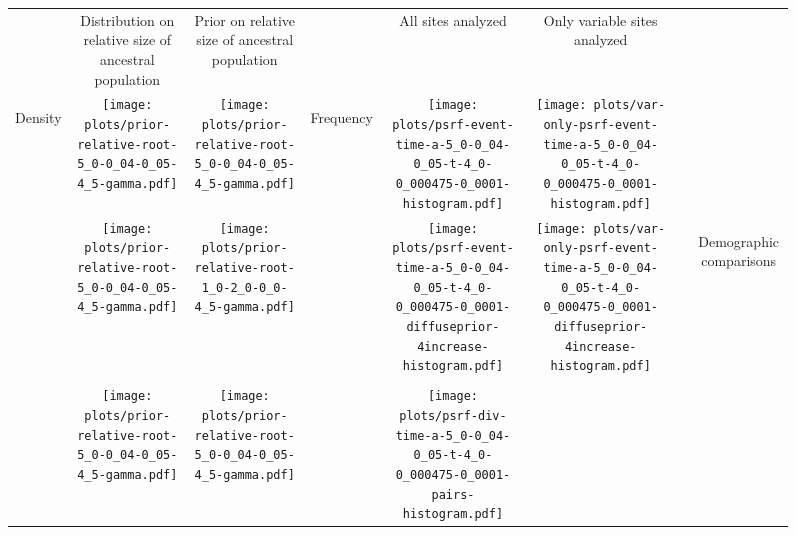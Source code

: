 \documentclass[border=10pt,varwidth=30cm]{standalone}
\begin{document}
\begin{figure}
    \setlength\arrayrulewidth{2pt}
    \centering
    \begin{tabular}{@{}cccccccc@{}}
        & \multirow{1}{0.15\textwidth}{\centering\Large Distribution on relative size of ancestral population}
        & \multirow{1}{0.15\textwidth}{\centering\Large Prior on relative size of ancestral population}
        &
        & \multirow{1}{0.15\textwidth}{\centering\Large All sites analyzed}
        & \multirow{1}{0.15\textwidth}{\centering\Large Only variable sites analyzed}
        & 
        & \\[9ex]
        \multirow{5}{*}[-8em]{\begin{sideways}\large Density\end{sideways}}
        & \texttt{[image: plots/prior-relative-root-5\_0-0\_04-0\_05-4\_5-gamma.pdf]}
        & \texttt{[image: plots/prior-relative-root-5\_0-0\_04-0\_05-4\_5-gamma.pdf]}
        & \multirow{5}{*}[-14em]{\begin{sideways}\large Frequency\end{sideways}}
        & \texttt{[image: plots/psrf-event-time-a-5\_0-0\_04-0\_05-t-4\_0-0\_000475-0\_0001-histogram.pdf]}
        & \texttt{[image: plots/var-only-psrf-event-time-a-5\_0-0\_04-0\_05-t-4\_0-0\_000475-0\_0001-histogram.pdf]} 
        & \multicolumn{1}{c|}{} 
        & \\
        & \texttt{[image: plots/prior-relative-root-5\_0-0\_04-0\_05-4\_5-gamma.pdf]}
        & \texttt{[image: plots/prior-relative-root-1\_0-2\_0-0\_0-4\_5-gamma.pdf]}
        &
        & \texttt{[image: plots/psrf-event-time-a-5\_0-0\_04-0\_05-t-4\_0-0\_000475-0\_0001-diffuseprior-4increase-histogram.pdf]}
        & \texttt{[image: plots/var-only-psrf-event-time-a-5\_0-0\_04-0\_05-t-4\_0-0\_000475-0\_0001-diffuseprior-4increase-histogram.pdf]}
        & \multicolumn{1}{c|}{} 
        & \multirow{5}{*}[17em]{\begin{sideways}\Large Demographic comparisons\end{sideways}} \\
        & & & & & & & \\
        & \texttt{[image: plots/prior-relative-root-5\_0-0\_04-0\_05-4\_5-gamma.pdf]}
        & \texttt{[image: plots/prior-relative-root-5\_0-0\_04-0\_05-4\_5-gamma.pdf]}
        &
        & \texttt{[image: plots/psrf-div-time-a-5\_0-0\_04-0\_05-t-4\_0-0\_000475-0\_0001-pairs-histogram.pdf]}

\end{tabular}
\end{figure}
\end{document}
